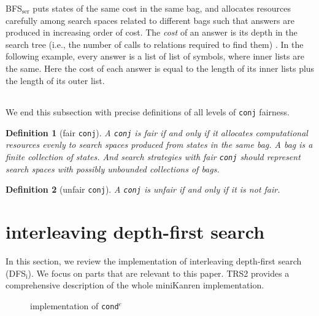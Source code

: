 \documentclass[format=acmlarge, review=true, authordraft=true]{acmart}
\newcommand{\conde}{\texttt{cond$^e$}}
\newcommand{\conj}{\texttt{conj}}
\newcommand{\DFSi }[0]{DFS$_\textrm{i}$}
\newcommand{\BFSser}[0]{BFS$_\textrm{ser}$}
\newtheorem{defn}{Definition}[section]
\begin{document}
\BFSser{} puts states of the same cost in the same bag, and allocates
resources carefully among search spaces related to different bags such
that answers are produced in increasing order of cost. The \emph{cost}
of an answer is its depth in the search tree (i.e., the number of
calls to relations required to find them) \citep{seres1999algebra}. In
the following example, every answer is a list of list of symbols,
where inner lists are the same. Here the cost of each answer is equal
to the length of its inner lists plus the length of its outer list.

\begin{center}
	\begin{tabular}{c}
		
	\end{tabular}
\end{center}

We end this subsection with precise definitions of all levels of \conj{} 
fairness. 


\begin{defn}[fair \conj{}]
A \conj{} is fair if and only if it allocates computational resources evenly to 
search spaces produced from states in the same bag. A bag is a finite 
collection of states. And search strategies with fair \conj{} should represent 
search spaces with possibly unbounded collections of bags. 
\end{defn}

\begin{defn}[unfair \conj{}]
A \conj{} is unfair if and only if it is not fair.
\end{defn}





\section{interleaving depth-first search}

In this section, we review the implementation of interleaving depth-first 
search (\DFSi). We focus on parts that are relevant to this paper. TRS2 
\citep{friedman_reasoned_2018} provides a comprehensive description of the 
whole miniKanren implementation.

\begin{figure}
	
	\caption{implementation of \conde}
	\label{conde}
\end{figure}
\end{document}

